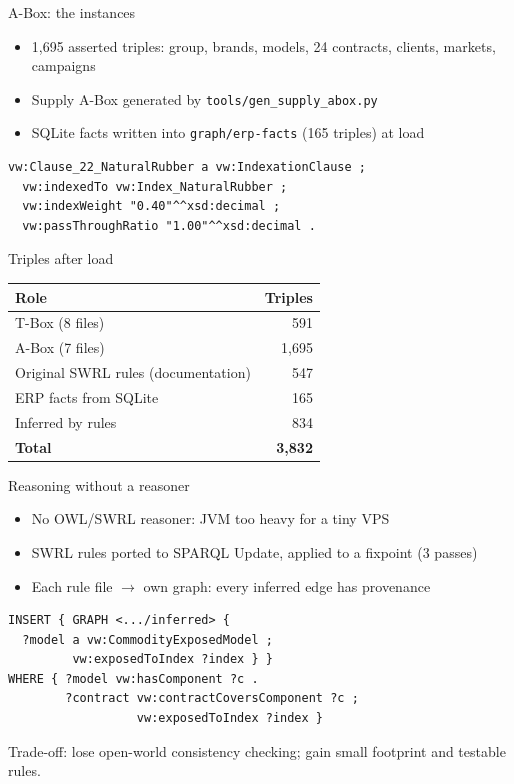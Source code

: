 \documentclass[aspectratio=169,11pt]{beamer}
\begin{document}
\begin{frame}[fragile]{A-Box: the instances}
\begin{itemize}\small
\item 1,695 asserted triples: group, brands, models, 24 contracts, clients, markets, campaigns
\item Supply A-Box \alert{generated} by \texttt{tools/gen\_supply\_abox.py}
\item SQLite facts written into \texttt{graph/erp-facts} (165 triples) at load
\end{itemize}
{\footnotesize
\begin{verbatim}
vw:Clause_22_NaturalRubber a vw:IndexationClause ;
  vw:indexedTo vw:Index_NaturalRubber ;
  vw:indexWeight "0.40"^^xsd:decimal ;
  vw:passThroughRatio "1.00"^^xsd:decimal .
\end{verbatim}}
\end{frame}

\begin{frame}{Triples after load}
\centering
\begin{tabular}{lr}
\toprule Role & Triples\\\midrule
T-Box (8 files) & 591\\
A-Box (7 files) & 1,695\\
Original SWRL rules (documentation) & 547\\
ERP facts from SQLite & 165\\
Inferred by rules & 834\\\midrule
\textbf{Total} & \textbf{3,832}\\\bottomrule
\end{tabular}
\end{frame}

\begin{frame}[fragile]{Reasoning without a reasoner}
\begin{itemize}\small
\item No OWL/SWRL reasoner: JVM too heavy for a tiny VPS
\item SWRL rules ported to \alert{SPARQL Update}, applied to a \alert{fixpoint} (3 passes)
\item Each rule file $\to$ own graph: every inferred edge has provenance
\end{itemize}
{\footnotesize
\begin{verbatim}
INSERT { GRAPH <.../inferred> {
  ?model a vw:CommodityExposedModel ;
         vw:exposedToIndex ?index } }
WHERE { ?model vw:hasComponent ?c .
        ?contract vw:contractCoversComponent ?c ;
                  vw:exposedToIndex ?index }
\end{verbatim}}
\small Trade-off: lose open-world consistency checking; gain small footprint and testable rules.
\end{frame}
\end{document}
